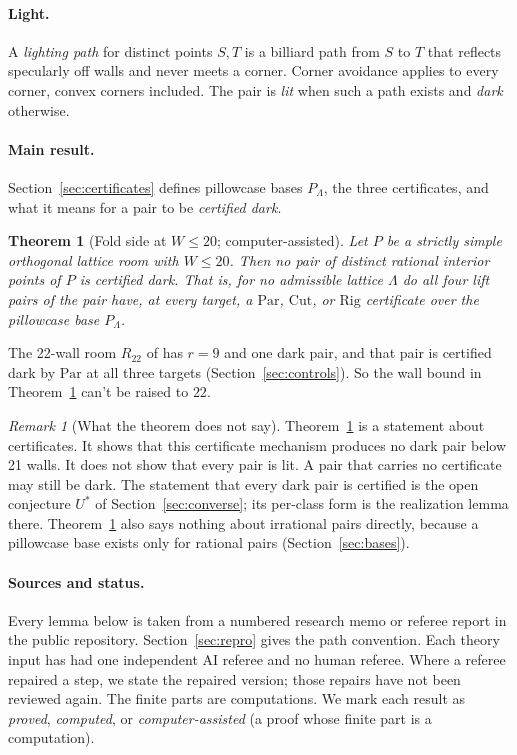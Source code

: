 \documentclass[11pt]{article}
\newtheorem{theorem}{Theorem}
\theoremstyle{definition}
\theoremstyle{remark}
\newtheorem{remark}{Remark}
\newcommand{\Par}{\mathrm{Par}}
\newcommand{\Rig}{\mathrm{Rig}}
\newcommand{\Cut}{\mathrm{Cut}}
\newcommand{\Rr}{R_{22}}
\begin{document}
\paragraph{Light.}
A \emph{lighting path} for distinct points $S,T$ is a billiard path from $S$ to
$T$ that reflects specularly off walls and never meets a corner. Corner
avoidance applies to every corner, convex corners included. The pair is
\emph{lit} when such a path exists and \emph{dark} otherwise.

\paragraph{Main result.}
Section~\ref{sec:certificates} defines pillowcase bases $P_\Lambda$, the
three certificates, and what it means for a pair to be \emph{certified dark}.

\begin{theorem}[Fold side at $W\le 20$; computer-assisted]\label{thm:main}
Let $P$ be a strictly simple orthogonal lattice room with $W\le 20$. Then no
pair of distinct rational interior points of $P$ is certified dark. That is,
for no admissible lattice $\Lambda$ do all four lift pairs of the pair have,
at every target, a $\Par$, $\Cut$, or $\Rig$ certificate over the pillowcase
base $P_\Lambda$.
\end{theorem}

The 22-wall room $\Rr$ of \cite{Q22} has $r=9$ and one dark pair, and that
pair is certified dark by $\Par$ at all three targets
(Section~\ref{sec:controls}). So the wall bound in Theorem~\ref{thm:main}
can't be raised to $22$.

\begin{remark}[What the theorem does not say]\label{rem:scope}
Theorem~\ref{thm:main} is a statement about certificates. It shows that this
certificate mechanism produces no dark pair below 21 walls. It does not show
that every pair is lit. A pair that carries no certificate may still be dark.
The statement that every dark pair is certified is the open conjecture $U^*$
of Section~\ref{sec:converse}; its per-class form is the realization lemma
there. Theorem~\ref{thm:main} also says nothing about irrational pairs
directly, because a pillowcase base exists only for rational pairs
(Section~\ref{sec:bases}).
\end{remark}

\paragraph{Sources and status.}
Every lemma below is taken from a numbered research memo or referee report in
the public repository. Section~\ref{sec:repro} gives the path convention.
Each theory input has had one independent AI referee and no human referee.
Where a referee repaired a step, we state the repaired version; those repairs
have not been reviewed again. The finite parts are computations. We mark each
result as \emph{proved}, \emph{computed}, or \emph{computer-assisted} (a proof
whose finite part is a computation).
\end{document}
